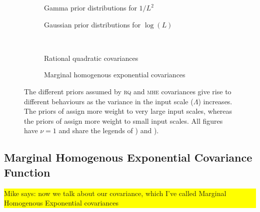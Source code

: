 \documentclass{article}
\newcommand\mikesays[1]{\colorbox{yellow}{\parbox{\columnwidth}{Mike says: #1}}}
\begin{document}
\begin{figure}
	\begin{subfigure}[b]{7cm}
		\caption{Gamma prior distributions for $1/L^2$}
		\label{fig:gamma_prior}
	\end{subfigure}
	\begin{subfigure}[b]{7cm}
		\caption{Gaussian prior distributions for $\log(L)$}
		 \label{fig:log_normal_prior}
	\end{subfigure}
 \\[0.2cm]
	\begin{subfigure}[b]{7cm}
		\caption{Rational quadratic covariances}
		\label{fig:RQ_cov}
	\end{subfigure}
	\begin{subfigure}[b]{7cm}
		\caption{Marginal homogenous exponential covariances}
		 \label{fig:our_cov}
	\end{subfigure}
\caption{The different priors assumed by {\scshape rq} and {\scshape mhe} covariances give rise to different behaviours as the variance in the input scale ($\Lambda$) increases. The priors of  assign more weight to very large input scales, whereas the priors of  assign more weight to small input scales. All figures have $\nu = 1$ and share the legends of ) and ).}
\label{fig:rq_vs_our_cov}
\end{figure}


\subsection{Marginal Homogenous Exponential Covariance Function} \mikesays{now we talk about our covariance, which I've called Marginal Homogenous Exponential covariances}
\end{document}
